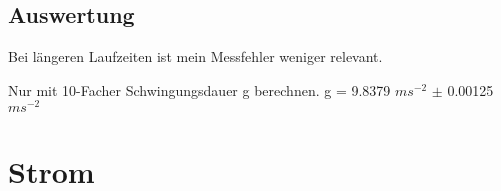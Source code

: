 \documentclass[12pt,a4paper]{article}
\begin{document}
\begin{multicols}{2}
\subsection{Auswertung}
Bei längeren Laufzeiten ist mein Messfehler weniger relevant.

Nur mit 10-Facher Schwingungsdauer g berechnen.
g = 9.8379 $ms^{-2}$ $\pm $ 0.00125 $ms^{-2}$
\section{Strom}
\end{multicols}
\end{document}
